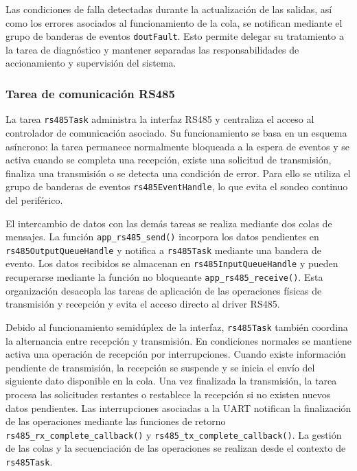 Las condiciones de falla detectadas durante la actualización de las salidas, así como los errores asociados al funcionamiento de la cola, se notifican mediante el grupo de banderas de eventos \texttt{doutFault}. Esto permite delegar su tratamiento a la tarea de diagnóstico y mantener separadas las responsabilidades de accionamiento y supervisión del sistema.

\subsubsection{Tarea de comunicación RS485}

La tarea \texttt{rs485Task} administra la interfaz RS485 y centraliza el acceso al controlador de comunicación asociado. Su funcionamiento se basa en un esquema asíncrono: la tarea permanece normalmente bloqueada a la espera de eventos y se activa cuando se completa una recepción, existe una solicitud de transmisión, finaliza una transmisión o se detecta una condición de error. Para ello se utiliza el grupo de banderas de eventos \texttt{rs485EventHandle}, lo que evita el sondeo continuo del periférico.

El intercambio de datos con las demás tareas se realiza mediante dos colas de mensajes. La función \texttt{app\_rs485\_send()} incorpora los datos pendientes en \texttt{rs485OutputQueueHandle} y notifica a \texttt{rs485Task} mediante una bandera de evento. Los datos recibidos se almacenan en \texttt{rs485InputQueueHandle} y pueden recuperarse mediante la función no bloqueante \texttt{app\_rs485\_receive()}. Esta organización desacopla las tareas de aplicación de las operaciones físicas de transmisión y recepción y evita el acceso directo al driver RS485.

Debido al funcionamiento semidúplex de la interfaz, \texttt{rs485Task} también coordina la alternancia entre recepción y transmisión. En condiciones normales se mantiene activa una operación de recepción por interrupciones. Cuando existe información pendiente de transmisión, la recepción se suspende y se inicia el envío del siguiente dato disponible en la cola. Una vez finalizada la transmisión, la tarea procesa las solicitudes restantes o restablece la recepción si no existen nuevos datos pendientes. Las interrupciones asociadas a la UART notifican la finalización de las operaciones mediante las funciones de retorno \texttt{rs485\_rx\_complete\_\-callback()} y \texttt{rs485\_tx\_complete\_callback()}. La gestión de las colas y la secuenciación de las operaciones se realizan desde el contexto de \texttt{rs485Task}.

